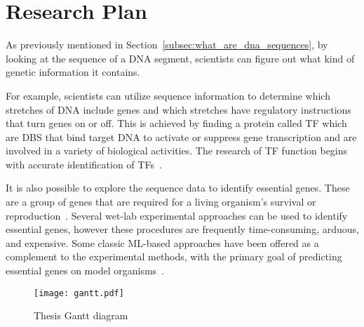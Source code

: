 \chapter{Research Plan}
\label{cha:research_plan}

As previously mentioned in Section~\ref{subsec:what_are_dna_sequences}, by looking at the sequence of a DNA segment, scientists can figure out what kind of genetic information it contains. 

For example, scientists can utilize sequence information to determine which stretches of DNA include genes and which stretches have regulatory instructions that turn genes on or off. This is achieved by finding a protein called \gls{TF} which are \gls{DBS} that bind target DNA to activate or suppress gene transcription and are involved in a variety of biological activities. The research of \gls{TF} function begins with accurate identification of \gls{TF}s~\cite{Hu2019AnimalTFDBFactors}.

It is also possible to explore the sequence data to identify essential genes. These are a group of genes that are required for a living organism's survival or reproduction~\cite{Zhang2020DeepHE:Learning}. Several wet-lab experimental approaches can be used to identify essential genes, however these procedures are frequently time-consuming, arduous, and expensive. Some classic \gls{ML}-based approaches have been offered as a complement to the experimental methods, with the primary goal of predicting essential genes on model organisms~\cite{Zhang2020DeepHE:Learning}.

\begin{figure}[htbp]
    \centering
    \texttt{[image: gantt.pdf]}
    \caption{Thesis Gantt diagram}
    \label{fig:gantt}
\end{figure}
